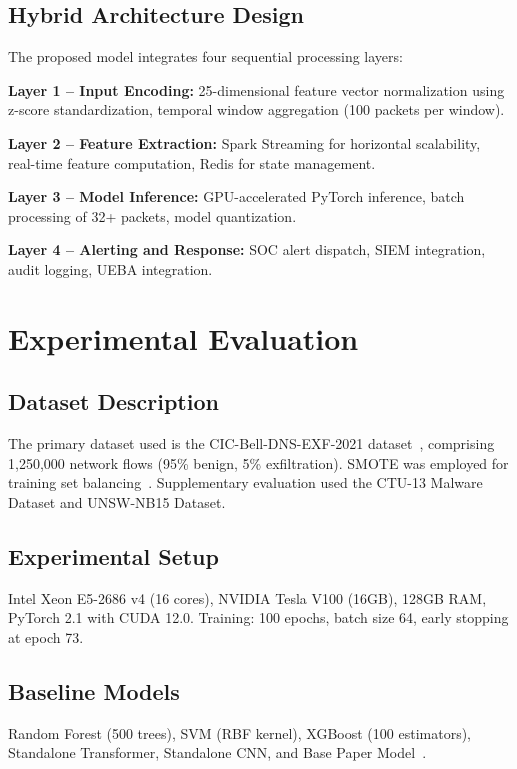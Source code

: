 \documentclass[conference]{IEEEtran}
\begin{document}
\subsection{Hybrid Architecture Design}

The proposed model integrates four sequential processing layers:

\textbf{Layer 1 -- Input Encoding:} 25-dimensional feature vector normalization using z-score standardization, temporal window aggregation (100 packets per window).

\textbf{Layer 2 -- Feature Extraction:} Spark Streaming for horizontal scalability, real-time feature computation, Redis for state management.

\textbf{Layer 3 -- Model Inference:} GPU-accelerated PyTorch inference, batch processing of 32+ packets, model quantization.

\textbf{Layer 4 -- Alerting and Response:} SOC alert dispatch, SIEM integration, audit logging, UEBA integration.

\section{Experimental Evaluation}
\label{sec:experiments}

\subsection{Dataset Description}

The primary dataset used is the CIC-Bell-DNS-EXF-2021 dataset~\cite{cic2021dataset}, comprising 1,250,000 network flows (95\% benign, 5\% exfiltration). SMOTE was employed for training set balancing~\cite{chawla2002smote}. Supplementary evaluation used the CTU-13 Malware Dataset and UNSW-NB15 Dataset.

\subsection{Experimental Setup}

Intel Xeon E5-2686 v4 (16 cores), NVIDIA Tesla V100 (16GB), 128GB RAM, PyTorch 2.1 with CUDA 12.0. Training: 100 epochs, batch size 64, early stopping at epoch 73.

\subsection{Baseline Models}

Random Forest (500 trees), SVM (RBF kernel), XGBoost (100 estimators), Standalone Transformer, Standalone CNN, and Base Paper Model~\cite{chen2023hybrid}.
\end{document}
